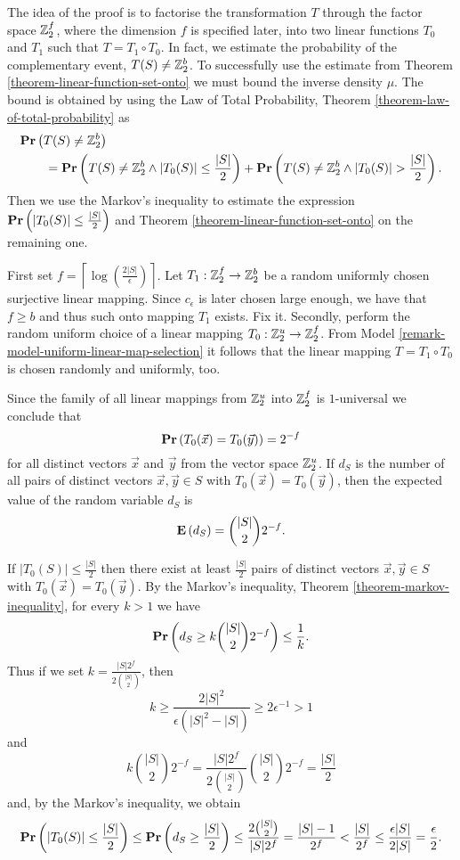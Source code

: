 The idea of the proof is to factorise the transformation $T$ through the factor space $\mathbb{Z}_{2}^{f}$, where the dimension $f$ is specified later, into two linear functions $T_0$ and $T_1$ such that $T = T_1 \circ T_0$. In fact, we estimate the probability of the complementary event, $T(S) \neq \mathbb{Z}_{2}^{b}$. To successfully use the estimate from Theorem \ref{theorem-linear-function-set-onto} we must bound the inverse density $\mu$. The bound is obtained by using the Law of Total Probability, Theorem \ref{theorem-law-of-total-probability} as
\[
\begin{split}
& \mathbf{Pr}\left(T(S) \neq \mathbb{Z}_{2}^{b}\right) \\
& \qquad = \mathbf{Pr}\left(T(S) \neq \mathbb{Z}_{2}^{b} \wedge |T_0(S)| \leq \frac{|S|}{2}\right) + \mathbf{Pr}\left(T(S) \neq \mathbb{Z}_{2}^{b} \wedge |T_0(S)| > \frac{|S|}{2}\right) \text{.}
\end{split}
\] 
Then we use the Markov's inequality to estimate the expression $\mathbf{Pr}\left(|T_0(S)| \leq \frac{|S|}{2}\right)$ and Theorem \ref{theorem-linear-function-set-onto} on the remaining one.

First set $f = \left\lceil\log(\frac {2|S|}{\epsilon})\right\rceil$. Let $T_1: \mathbb{Z}_{2}^{f} \rightarrow \mathbb{Z}_{2}^{b}$ be a random uniformly chosen surjective linear mapping. Since $c_\epsilon$ is later chosen large enough, we have that $f \geq b$ and thus such onto mapping $T_1$ exists. Fix it. Secondly, perform the random uniform choice of a linear mapping $T_0: \mathbb{Z}_{2}^{u} \rightarrow \mathbb{Z}_{2}^{f}$. From Model \ref{remark-model-uniform-linear-map-selection} it follows that the linear mapping $T = T_1 \circ T_0$ is chosen randomly and uniformly, too.

Since the family of all linear mappings from $\mathbb{Z}_{2}^{u}$ into $\mathbb{Z}_{2}^{f}$ is $1$-universal we conclude that \[ \mathbf{Pr}\left(T_0(\vec{x}) = T_0(\vec{y})\right) = 2 ^ {-f} \] for all distinct vectors $\vec {x}$ and $\vec {y}$ from the vector space $\mathbb{Z}_{2}^{u}$. If $d_S$ is the number of  all pairs of distinct vectors $\vec {x},\vec {y}\in S$ with $T_0(\vec {x}) = T_0(\vec {y})$, then the expected value of the random variable $d_S$ is \[ \mathbf{E}\left(d_S\right)= \binom{|S|}{2} 2 ^ {-f} \text{.} \]

If $|T_0(S)| \leq \frac {|S|}{2}$ then there exist at least $\frac {|S|}{2}$ pairs of distinct vectors $\vec{x}, \vec{y} \in S$ with $T_0(\vec {x}) = T_0(\vec {y})$. By the Markov's inequality, Theorem \ref{theorem-markov-inequality}, for every $k > 1$ we have \[ \mathbf{Pr}\left(d_S \geq k\binom {|S|}{2} 2^{-f}\right) \leq \frac{1}{k} \text{.} \]
Thus if we set $k = \frac {|S|2 ^ f}{2\binom {|S|}{2}}$, then 
\[
	k \geq \frac{2|S| ^ 2}{\epsilon(|S| ^ 2 - |S|)} \ge 2\epsilon ^ {-1} > 1 
\] 
and
\[
	k\binom{|S|}{2} 2 ^ {-f} = \frac{|S|2 ^ f}{2\binom{|S|}{2}}\binom{|S|}{2} 2 ^ {-f} = \frac{|S|}{2}
\]
and, by the Markov's inequality, we obtain
\[ 
	\mathbf{Pr}\left(|T_0(S)| \leq \frac {|S|}{2}\right) 
		\leq \mathbf{Pr}\left(d_S \geq \frac {|S|}{2}\right) 
		\leq \frac{2 \binom{|S|}{2}}{|S|2 ^ f} = \frac{|S| - 1}{2 ^ f} < \frac{|S|}{2 ^ f} 
		\leq \frac{\epsilon |S|}{2|S|} = \frac{\epsilon}{2} \text{.}
\]

